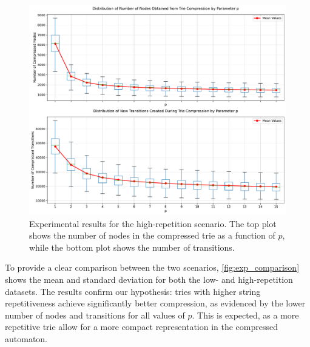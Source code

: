 \begin{figure}[H]
    \centering
    \includegraphics[width=1\linewidth]{Immagini/tree_compression_analysis_high.pdf}
    \caption{Experimental results for the high-repetition scenario. The top plot shows the number of nodes in the compressed trie as a function of $p$, while the bottom plot shows the number of transitions.}
    \label{fig:exp_high_rep}
\end{figure}

To provide a clear comparison between the two scenarios, \cref{fig:exp_comparison} shows the mean and standard deviation for both the low- and high-repetition datasets. The results confirm our hypothesis: tries with higher string repetitiveness achieve significantly better compression, as evidenced by the lower number of nodes and transitions for all values of $p$. This is expected, as a more repetitive trie allow for a more compact representation in the compressed automaton.

